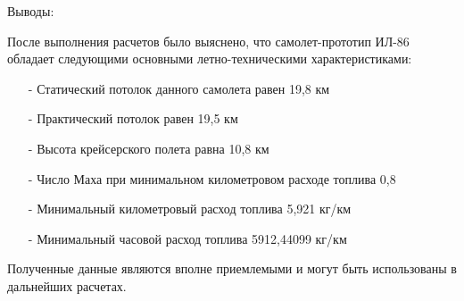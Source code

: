 \begin{center}
    Выводы:
\end{center}

После выполнения расчетов было выяснено, что самолет-прототип ИЛ-86 обладает следующими основными летно-техническими характеристиками:
\begin{itemize}
    \item [-] Статический потолок данного самолета равен 19,8 км
    \item [-] Практический потолок равен 19,5 км
    \item [-] Высота крейсерского полета равна 10,8 км
    \item [-] Число Маха при минимальном километровом расходе топлива 0,8
    \item [-] Минимальный километровый расход топлива 5,921 кг/км
    \item [-] Минимальный часовой расход топлива 5912,44099 кг/км
\end{itemize}

Полученные данные являются вполне приемлемыми и могут быть использованы в дальнейших расчетах.